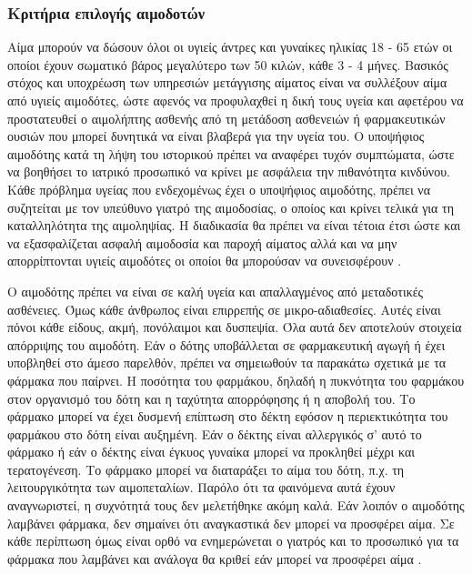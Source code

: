 		\subsubsection{Κριτήρια επιλογής αιμοδοτών} \label{sssec:donor_screening} 
			Αίμα μπορούν να δώσουν όλοι οι υγιείς άντρες και γυναίκες ηλικίας 18 - 65 ετών οι οποίοι έχουν σωματικό βάρος μεγαλύτερο των 50 κιλών, κάθε 3 - 4 μήνες. Βασικός στόχος και υποχρέωση των υπηρεσιών μετάγγισης αίματος είναι να συλλέξουν αίμα από υγιείς αιμοδότες, ώστε αφενός να προφυλαχθεί η δική τους υγεία και αφετέρου να προστατευθεί ο αιμολήπτης ασθενής από τη μετάδοση ασθενειών ή φαρμακευτικών ουσιών που μπορεί δυνητικά να είναι βλαβερά για την υγεία του. Ο υποψήφιος αιμοδότης κατά τη λήψη του ιστορικού πρέπει να αναφέρει τυχόν συμπτώματα, ώστε να βοηθήσει το ιατρικό προσωπικό να κρίνει με ασφάλεια την πιθανότητα κινδύνου. Κάθε πρόβλημα υγείας που ενδεχομένως έχει ο υποψήφιος αιμοδότης, πρέπει να συζητείται με τον υπεύθυνο γιατρό της αιμοδοσίας, ο οποίος και κρίνει τελικά για τη καταλληλότητα της αιμοληψίας. Η διαδικασία θα πρέπει να είναι τέτοια έτσι ώστε και να εξασφαλίζεται ασφαλή αιμοδοσία και παροχή αίματος αλλά και να μην απορρίπτονται υγιείς αιμοδότες οι οποίοι θα μπορούσαν να συνεισφέρουν \cite{bloodDonorSelection}.
			
			Ο αιμοδότης πρέπει να είναι σε καλή υγεία και απαλλαγμένος από μεταδοτικές ασθένειες. Όμως κάθε άνθρωπος είναι επιρρεπής σε μικρο-αδιαθεσίες. Αυτές είναι πόνοι κάθε είδους, ακμή, πονόλαιμοι και δυσπεψία. Όλα αυτά δεν αποτελούν στοιχεία απόρριψης του αιμοδότη. Εάν ο δότης υποβάλλεται σε φαρμακευτική αγωγή ή έχει υποβληθεί στο άμεσο παρελθόν, πρέπει να σημειωθούν τα παρακάτω σχετικά με τα φάρμακα που παίρνει. Η ποσότητα του φαρμάκου, δηλαδή η πυκνότητα του φαρμάκου στον οργανισμό του δότη και η ταχύτητα απορρόφησης ή η αποβολή του. Το φάρμακο μπορεί να έχει δυσμενή επίπτωση στο δέκτη εφόσον η περιεκτικότητα του φαρμάκου στο δότη είναι αυξημένη. Εάν ο δέκτης είναι αλλεργικός σ' αυτό το φάρμακο ή εάν ο δέκτης είναι έγκυος γυναίκα μπορεί να προκληθεί μέχρι και τερατογένεση. Το φάρμακο μπορεί να διαταράξει το αίμα του δότη, π.χ. τη λειτουργικότητα των αιμοπεταλίων. Παρόλο ότι τα φαινόμενα αυτά έχουν αναγνωριστεί, η συχνότητά τους δεν μελετήθηκε ακόμη καλά. Εάν λοιπόν ο αιμοδότης λαμβάνει φάρμακα, δεν σημαίνει ότι αναγκαστικά δεν μπορεί να προσφέρει αίμα. Σε κάθε περίπτωση όμως είναι ορθό να ενημερώνεται ο γιατρός και το προσωπικό για τα φάρμακα που λαμβάνει και ανάλογα θα κριθεί εάν μπορεί να προσφέρει αίμα \cite{bloodDonorSelection}. 
			
